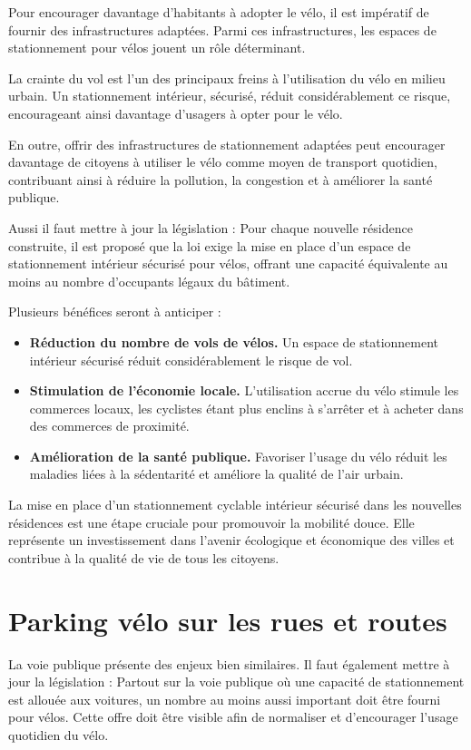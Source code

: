 Pour encourager davantage d'habitants à adopter le vélo, il est
impératif de fournir des infrastructures adaptées. Parmi ces
infrastructures, les espaces de stationnement pour vélos jouent un
rôle déterminant.

La crainte du vol est l'un des principaux freins à l'utilisation du
vélo en milieu urbain. Un stationnement intérieur, sécurisé, réduit
considérablement ce risque, encourageant ainsi davantage d'usagers à
opter pour le vélo.

En outre, offrir des infrastructures de stationnement adaptées peut
encourager davantage de citoyens à utiliser le vélo comme moyen de
transport quotidien, contribuant ainsi à réduire la pollution, la
congestion et à améliorer la santé publique.

Aussi il faut mettre à jour la législation : Pour chaque nouvelle
résidence construite, il est proposé que la loi exige la mise en place
d'un espace de stationnement intérieur sécurisé pour vélos, offrant
une capacité équivalente au moins au nombre d'occupants légaux du
bâtiment.

Plusieurs bénéfices seront à anticiper :
\begin{itemize}
\item \textbf{Réduction du nombre de vols de vélos.} Un espace de
  stationnement intérieur sécurisé réduit considérablement le risque
  de vol.
\item \textbf{Stimulation de l'économie locale.} L'utilisation accrue
  du vélo stimule les commerces locaux, les cyclistes étant plus
  enclins à s'arrêter et à acheter dans des commerces de proximité.
\item \textbf{Amélioration de la santé publique.} Favoriser l'usage
  du vélo réduit les maladies liées à la sédentarité et améliore la
  qualité de l'air urbain.
\end{itemize}

\medskip

La mise en place d'un stationnement cyclable intérieur sécurisé dans
les nouvelles résidences est une étape cruciale pour promouvoir la
mobilité douce. Elle représente un investissement dans l'avenir
écologique et économique des villes et contribue à la qualité de vie
de tous les citoyens.


\section{Parking vélo sur les rues et routes}

La voie publique présente des enjeux bien similaires.  Il faut
également mettre à jour la législation : Partout sur la voie publique
où une capacité de stationnement est allouée aux voitures, un nombre
au moins aussi important doit être fourni pour vélos.  Cette offre
doit être visible afin de normaliser et d’encourager l’usage quotidien
du vélo.


